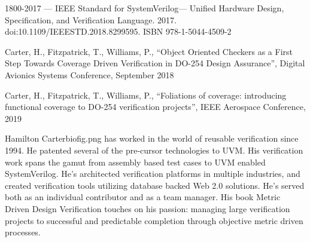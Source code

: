 \documentclass[twocolumn,letterpaper]{IEEEAerospaceCLS}  %
\begin{document}

%
\begin{thebibliography}{1}

1800-2017 — IEEE Standard for SystemVerilog—
Unified Hardware Design, Specification, and Verification
Language. 2017. doi:10.1109/IEEESTD.2018.8299595.
ISBN 978-1-5044-4509-2

Carter, H., Fitzpatrick, T., Williams, P., “Object Oriented
Checkers as a First Step Towards Coverage Driven
Verification in DO-254 Design Assurance”, Digital
Avionics Systems Conference, September 2018

Carter, H., Fitzpatrick, T., Williams, P., “Foliations of coverage: introducing functional coverage to DO-254 verification projects”, IEEE Aerospace Conference, 2019

\end{thebibliography}


\thebiography
\begin{biographywithpic}
{Hamilton Carter}{biofig.png}
has worked in
the world of reusable verification
since 1994. He patented several of
the pre-cursor technologies to UVM.
His verification work spans the
gamut from assembly based test
cases to UVM enabled
SystemVerilog. He’s architected
verification platforms in multiple industries, and created
verification tools utilizing database backed Web 2.0
solutions. He’s served both as an individual contributor
and as a team manager. His book Metric Driven Design
Verification touches on his passion: managing large
verification projects to successful and predictable
completion through objective metric driven processes.

\end{biographywithpic} 
\end{document}

